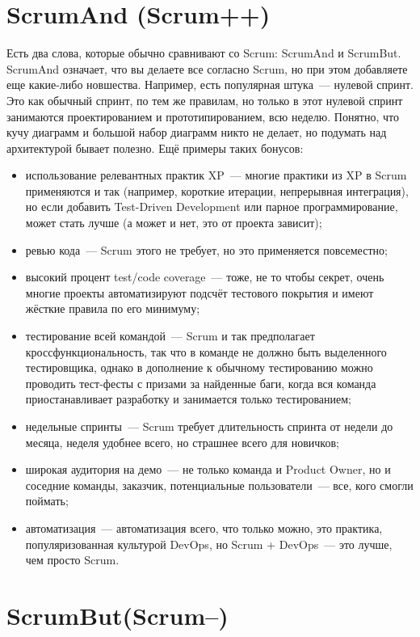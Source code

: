 \documentclass{../../text-style}
\begin{document}
\section{ScrumAnd (Scrum++)}

Есть два слова, которые обычно сравнивают со Scrum: ScrumAnd и ScrumBut. ScrumAnd означает, что вы делаете все согласно Scrum, но при этом добавляете еще какие-либо новшества. Например, есть популярная штука~--- нулевой спринт. Это как обычный спринт, по тем же правилам, но только в этот нулевой спринт занимаются проектированием и прототипированием, всю неделю. Понятно, что кучу диаграмм и большой набор диаграмм никто не делает, но подумать над архитектурой бывает полезно. Ещё примеры таких бонусов:

\begin{itemize}
    \item использование релевантных практик XP~--- многие практики из XP в Scrum применяются и так (например, короткие итерации, непрерывная интеграция), но если добавить Test-Driven Development или парное программирование, может стать лучше (а может и нет, это от проекта зависит);
    \item ревью кода~--- Scrum этого не требует, но это применяется повсеместно;
    \item высокий процент test/code coverage~--- тоже, не то чтобы секрет, очень многие проекты автоматизируют подсчёт тестового покрытия и имеют жёсткие правила по его минимуму;
    \item тестирование всей командой~--- Scrum и так предполагает кроссфункциональность, так что в команде не должно быть выделенного тестировщика, однако в дополнение к обычному тестированию можно проводить тест-фесты с призами за найденные баги, когда вся команда приостанавливает разработку и занимается только тестированием;
    \item недельные спринты~--- Scrum требует длительность спринта от недели до месяца, неделя удобнее всего, но страшнее всего для новичков;
    \item широкая аудитория на демо~--- не только команда и Product Owner, но и соседние команды, заказчик, потенциальные пользователи~--- все, кого смогли поймать;
    \item автоматизация~--- автоматизация всего, что только можно, это практика, популяризованная культурой DevOps, но Scrum + DevOps~--- это лучше, чем просто Scrum.
\end{itemize}

\section{ScrumBut(Scrum--)}
\end{document}
